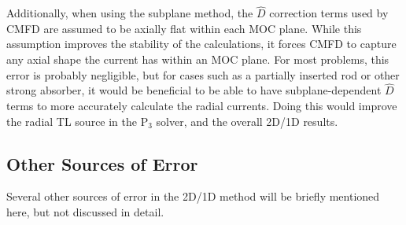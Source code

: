 Additionally, when using the subplane method, the $\hat{D}$ correction terms used by CMFD are assumed to be axially flat within each MOC plane.  While this assumption improves the stability of the calculations, it forces CMFD to capture any axial shape the current has within an MOC plane.  For most problems, this error is probably negligible, but for cases such as a partially inserted rod or other strong absorber, it would be beneficial to be able to have subplane-dependent $\hat{D}$ terms to more accurately calculate the radial currents.  Doing this would improve the radial TL source in the P$_3$ solver, and the overall 2D/1D results.

\subsection{Other Sources of Error}

Several other sources of error in the 2D/1D method will be briefly mentioned here, but not discussed in detail.

